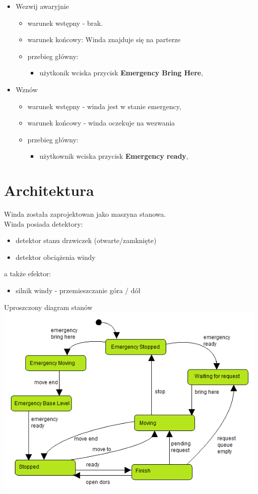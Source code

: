 \documentclass[a4paper,11pt]{article}
\begin{document}
\begin{itemize}
		\item Wezwij awaryjnie
		\begin{itemize}
			\item warunek wstępny - brak.
			\item warunek końcowy: Winda znajduje się na parterze
			\item przebieg główny:
			\begin{itemize}			
				\item użytkonik wciska przycisk \textbf{Emergency Bring Here},
			\end{itemize}
		\end{itemize}
		
		\item Wznów
		\begin{itemize}
			\item warunek wstępny - winda jest w stanie emergency,
			\item warunek końcowy - winda oczekuje na wezwania
			\item przebieg główny:
			\begin{itemize}
				\item użytkownik wciska przycisk \textbf{Emergency ready},
			\end{itemize}
		\end{itemize}
		
	\end{itemize}
    
\section{Architektura}
	Winda została zaprojektowan jako maszyna stanowa. \\	
	Winda posiada detektory:
	\begin{itemize}
		\item detektor stanu drzwiczek (otwarte/zamknięte)
		\item detektor obciążenia windy
	\end{itemize}
	a także efektor:
	\begin{itemize}
		\item silnik windy - przemieszczanie góra / dół
	\end{itemize}

	Uproszczony diagram stanów \\
	\includegraphics{images/simplifiedStateChart.png}
	
\end{document}
